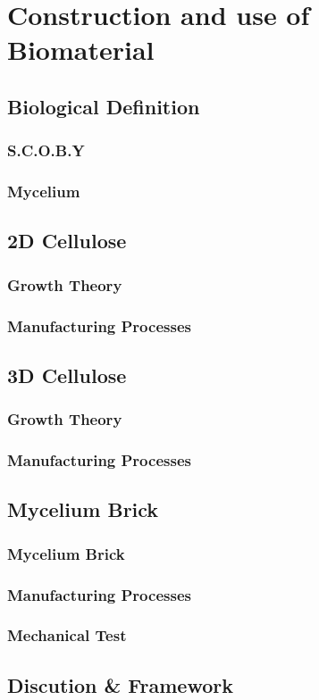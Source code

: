 \chapter{Construction and use of Biomaterial}


\section{Biological Definition}

\subsection{S.C.O.B.Y}
\subsection{Mycelium}

\section{2D Cellulose}

\subsection{Growth Theory}
\subsection{Manufacturing Processes}


\section{3D Cellulose}

\subsection{Growth Theory}
\subsection{Manufacturing Processes}



\section{Mycelium Brick}


\subsection{Mycelium Brick}
\subsection{Manufacturing Processes}
\subsection{Mechanical Test}



\section{Discution \& Framework}
